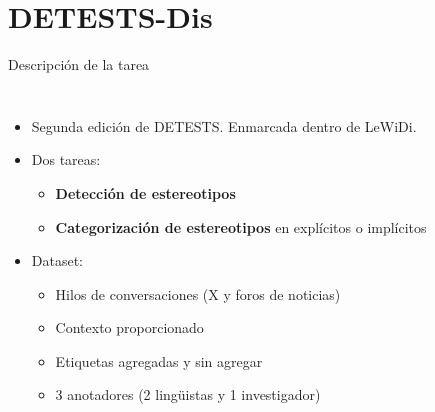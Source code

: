 \section{DETESTS-Dis}

\begin{frame}{Descripción de la tarea}
    \begin{columns}
            \begin{itemize}
                \item Segunda edición de DETESTS. Enmarcada dentro de LeWiDi.
                \item Dos tareas:
                    \begin{itemize}
                        \item \textbf{Detección de estereotipos}
                        \item \textbf{Categorización de estereotipos} en explícitos o implícitos 
                    \end{itemize}
                \item Dataset:
            \begin{itemize}
                \item Hilos de conversaciones (X y foros de noticias)
                \item Contexto proporcionado
                \item Etiquetas agregadas y sin agregar
                \item 3 anotadores (2 lingüistas y 1 investigador)
            \end{itemize}
    \end{itemize}
        \centering
        
        \begin{table}[]
            \small
            \centering
            

\end{table}
\end{columns}
\end{frame}
